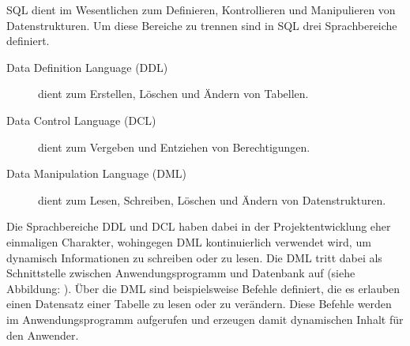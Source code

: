 SQL dient im Wesentlichen zum Definieren, Kontrollieren und Manipulieren von Datenstrukturen. Um diese 
Bereiche zu trennen sind in SQL drei Sprachbereiche definiert.

\begin{description}
  \item[Data Definition Language (DDL)] dient zum Erstellen, Löschen und Ändern von Tabellen.
  \item[Data Control Language (DCL)] dient zum Vergeben und Entziehen von Berechtigungen.
  \item[Data Manipulation Language (DML)] dient zum Lesen, Schreiben, Löschen und Ändern von Datenstrukturen.
\end{description}

Die Sprachbereiche DDL und DCL haben dabei in der Projektentwicklung eher einmaligen Charakter, wohingegen DML 
kontinuierlich verwendet wird, um dynamisch Informationen zu schreiben oder zu lesen. Die DML tritt dabei als 
Schnittstelle zwischen Anwendungsprogramm und Datenbank auf (siehe Abbildung: ). Über die DML sind beispielsweise 
Befehle definiert, die es erlauben einen Datensatz einer Tabelle zu lesen oder zu verändern. Diese Befehle werden im 
Anwendungsprogramm aufgerufen und erzeugen damit dynamischen Inhalt für den Anwender.